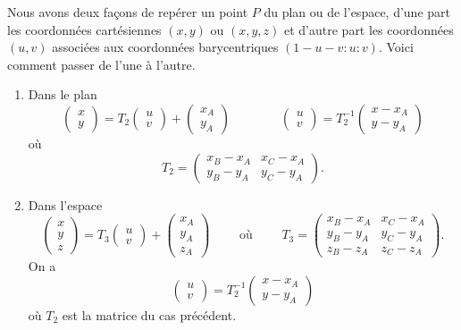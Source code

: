 \documentclass[11pt,class=report,crop=false]{standalone}
\begin{document}
Nous avons deux façons de repérer un point $P$ du plan ou de l'espace, d'une part les coordonnées cartésiennes $(x,y)$ ou $(x,y,z)$ et d'autre part les coordonnées $(u,v)$ associées aux coordonnées barycentriques $(1-u-v:u:v)$.
Voici comment passer de l'une à l'autre.
\begin{proposition}
	\sauteligne
\begin{enumerate}
	\item Dans le plan 
	$$\begin{pmatrix} x \\ y \end{pmatrix} = T_2  \begin{pmatrix} u \\ v \end{pmatrix} + \begin{pmatrix} x_A \\ y_A \end{pmatrix} \qquad \qquad  \begin{pmatrix} u \\ v \end{pmatrix} = T_2^{-1}  \begin{pmatrix} x -x_A \\ y-y_A \end{pmatrix}$$
	où 
	$$T_2 = \begin{pmatrix} x_B-x_A & x_C-x_A \\ y_B-y_A & y_C-y_A \end{pmatrix}.$$

	\item Dans l'espace 
	$$\begin{pmatrix} x \\ y \\ z \end{pmatrix} = T_3  \begin{pmatrix} u \\ v \end{pmatrix} + \begin{pmatrix} x_A \\ y_A \\ z_A \end{pmatrix}\qquad \text{ où } \qquad
    T_3 = \begin{pmatrix} x_B-x_A & x_C-x_A \\ y_B-y_A & y_C-y_A  \\ z_B-z_A & z_C-z_A \end{pmatrix}.$$	
    On a  
    $$\begin{pmatrix} u \\ v \end{pmatrix} = T_2^{-1}  \begin{pmatrix} x -x_A \\ y-y_A \end{pmatrix}$$
    où $T_2$ est la matrice du cas précédent.
\end{enumerate}
\end{proposition}	
\end{document}
